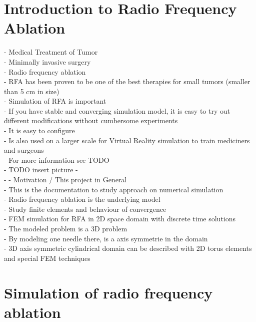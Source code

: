 \documentclass[parskip=half, titlepage=yes, 12pt, BCOR=12mm, DIV=calc]{scrartcl}
\begin{document}
\maketitle
\tableofcontents

\clearpage




\section{Introduction to Radio Frequency Ablation}
- Medical Treatment of Tumor\\
- Minimally invasive surgery \\ 
- Radio frequency ablation\\
- RFA has been proven to be one of the best therapies for small tumors (smaller than 5 cm in size) \\
- Simulation of RFA is important \\
- If you have stable and converging simulation model, it is easy to try out different modifications without cumbersome experiments \\ 
- It is easy to configure \\
- Is also used on a larger scale for Virtual Reality simulation to train mediciners and surgeons \\
- For more information see TODO \\
- TODO insert picture
- \\
- 
- Motivation / This project in General\\
- This is the documentation to study approach on numerical simulation \\
- Radio frequency ablation is the underlying model \\
- Study finite elements and behaviour of convergence \\
- FEM simulation for RFA in 2D space domain with discrete time solutions \\
- The modeled problem is a 3D problem \\
- By modeling one needle there, is a axis symmetrie in the domain \\
- 3D axis symmetric cylindrical domain can be described with 2D torus elements and special FEM techniques \\ 



\section{Simulation of radio frequency ablation}
\end{document}
